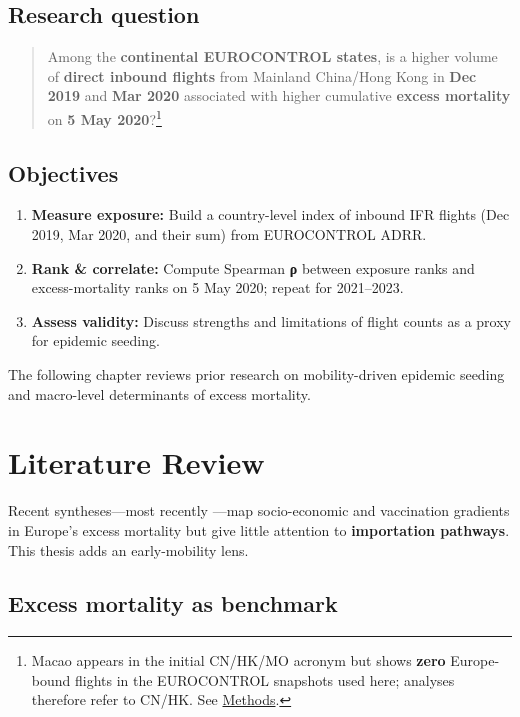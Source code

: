 \documentclass[
  authoryear,
  preprint,
  3p,
  onecolumn]{elsarticle}
\providecommand{\tightlist}{%
  \setlength{\itemsep}{0pt}\setlength{\parskip}{0pt}}\usepackage{longtable,booktabs,array}
\begin{document}
\subsection{Research question}\label{research-question}

\begin{quote}
Among the \textbf{continental EUROCONTROL states}, is a higher volume of
\textbf{direct inbound flights} from Mainland China/Hong Kong in
\textbf{Dec 2019} and \textbf{Mar 2020} associated with higher
cumulative \textbf{excess mortality} on \textbf{5 May 2020}?\footnote{Macao
  appears in the initial CN/HK/MO acronym but shows \textbf{zero}
  Europe-bound flights in the EUROCONTROL snapshots used here; analyses
  therefore refer to CN/HK. See \hyperref[methods]{Methods}.}
\end{quote}

\subsection{Objectives}\label{objectives}

\begin{enumerate}
\def\labelenumi{\arabic{enumi}.}
\tightlist
\item
  \textbf{Measure exposure:} Build a country-level index of inbound IFR
  flights (Dec 2019, Mar 2020, and their sum) from EUROCONTROL ADRR.
\item
  \textbf{Rank \& correlate:} Compute Spearman \textbf{ρ} between
  exposure ranks and excess-mortality ranks on 5 May 2020; repeat for
  2021--2023.
\item
  \textbf{Assess validity:} Discuss strengths and limitations of flight
  counts as a proxy for epidemic seeding.
\end{enumerate}

The following chapter reviews prior research on mobility-driven epidemic
seeding and macro-level determinants of excess mortality.

\section{Literature Review}\label{litrev}

Recent syntheses---most recently \citet{pizzato2024}---map
socio-economic and vaccination gradients in Europe's excess mortality
but give little attention to \textbf{importation pathways}. This thesis
adds an early-mobility lens.

\subsection{Excess mortality as
benchmark}\label{excess-mortality-as-benchmark}
\end{document}
